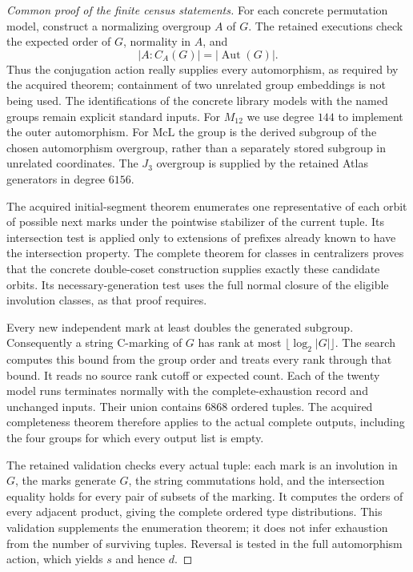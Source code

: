 \documentclass[11pt,a4paper]{article}
\begin{document}
\begin{proof}[Common proof of the finite census statements]
For each concrete permutation model, construct a normalizing overgroup
$A$ of $G$. The retained executions check the expected order of $G$,
normality in $A$, and
\[
                |A:C_A(G)|=|\operatorname{Aut}(G)|.
\]
Thus the conjugation action really supplies every automorphism, as
required by the acquired theorem; containment of two unrelated group
embeddings is not being used. The identifications of the concrete
library models with the named groups remain explicit standard inputs.
For $M_{12}$ we use degree $144$ to implement the outer automorphism.
For $\mathrm{McL}$ the group is the derived subgroup of the chosen
automorphism overgroup, rather than a separately stored subgroup in
unrelated coordinates. The $J_3$ overgroup is supplied by the retained
Atlas generators in degree $6156$.

The acquired initial-segment theorem enumerates one representative of
each orbit of possible next marks under the pointwise stabilizer of
the current tuple. Its intersection test is applied only to extensions
of prefixes already known to have the intersection property. The
complete theorem for classes in centralizers proves that the concrete
double-coset construction supplies exactly these candidate orbits.
Its necessary-generation test uses the full normal closure of the
eligible involution classes, as that proof requires.

Every new independent mark at least doubles the generated subgroup.
Consequently a string C-marking of $G$ has rank at most
$\lfloor\log_2|G|\rfloor$. The search computes this bound from the
group order and treats every rank through that bound. It reads no
source rank cutoff or expected count. Each of the twenty model runs
terminates normally with the complete-exhaustion record and unchanged
inputs. Their union contains $6868$ ordered tuples. The acquired
completeness theorem therefore applies to the actual complete outputs,
including the four groups for which every output list is empty.

The retained validation checks every actual tuple: each mark is an
involution in $G$, the marks generate $G$, the string commutations hold,
and the intersection equality holds for every pair of subsets of the
marking. It computes the orders of every adjacent product, giving the
complete ordered type distributions. This validation supplements the
enumeration theorem; it does not infer exhaustion from the number of
surviving tuples. Reversal is tested in the full automorphism action,
which yields $s$ and hence $d$.


\end{proof}
\end{document}
